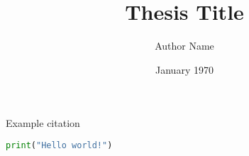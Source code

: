 \documentclass[
    draft,
    scrbook,
    listoffigures,
    listoflistings,
    glossary]{../cu-thesis}
\title{Thesis Title}
\author{Author Name}
\date{January 1970}
\begin{document}
    \frontmatter

    \Blinddocument
    Example citation~\cite{nash51}

    \begin{lstlisting}[language=Python, caption={Python hello world},label={listing:helloworld}]
print("Hello world!")
    \end{lstlisting}

    \layout
    
    \appendix

    
    
\end{document}
